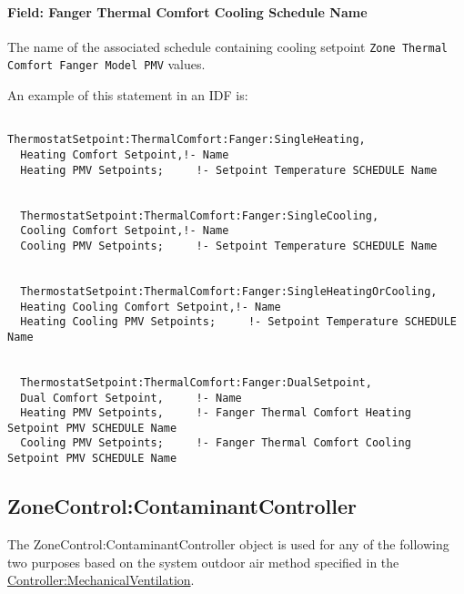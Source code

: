 \paragraph{Field: Fanger Thermal Comfort Cooling Schedule Name}\label{field-fanger-thermal-comfort-cooling-schedule-name}

The name of the associated schedule containing cooling setpoint \lstinline!Zone Thermal Comfort Fanger Model PMV! values.

An example of this statement in an IDF is:

\begin{lstlisting}

ThermostatSetpoint:ThermalComfort:Fanger:SingleHeating,
  Heating Comfort Setpoint,!- Name
  Heating PMV Setpoints;     !- Setpoint Temperature SCHEDULE Name


  ThermostatSetpoint:ThermalComfort:Fanger:SingleCooling,
  Cooling Comfort Setpoint,!- Name
  Cooling PMV Setpoints;     !- Setpoint Temperature SCHEDULE Name


  ThermostatSetpoint:ThermalComfort:Fanger:SingleHeatingOrCooling,
  Heating Cooling Comfort Setpoint,!- Name
  Heating Cooling PMV Setpoints;     !- Setpoint Temperature SCHEDULE Name


  ThermostatSetpoint:ThermalComfort:Fanger:DualSetpoint,
  Dual Comfort Setpoint,     !- Name
  Heating PMV Setpoints,     !- Fanger Thermal Comfort Heating Setpoint PMV SCHEDULE Name
  Cooling PMV Setpoints;     !- Fanger Thermal Comfort Cooling Setpoint PMV SCHEDULE Name
\end{lstlisting}

\subsection{ZoneControl:ContaminantController}\label{zonecontrolcontaminantcontroller}

The ZoneControl:ContaminantController object is used for any of the following two purposes based on the system outdoor air method specified in the \hyperref[controllermechanicalventilation]{Controller:MechanicalVentilation}.

